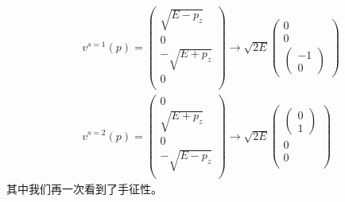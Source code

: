 \begin{equation}
\begin{aligned}
    &v^{s=1}(p)=\left(\begin{array}{cc}
         \sqrt{E-p_{z}}  \\
         0 \\
         -\sqrt{E+p_{z}}\\
         0\\
    \end{array}\right)\longrightarrow 
    \sqrt{2E}\left(\begin{array}{cc}
         0  \\
         0 \\
        \left(\begin{array}{cc}
             -1  \\
             0 
        \end{array}\right)
    \end{array}\right)\\
    &v^{s=2}(p)=\left(\begin{array}{cc}
    0\\
         \sqrt{E+p_{z}}  \\
         0 \\
         -\sqrt{E-p_{z}}\\
    \end{array}\right)\longrightarrow 
    \sqrt{2E}\left(\begin{array}{cc}
         \left(\begin{array}{cc}
             0  \\
             1 
        \end{array}\right)\\
         0\\
         0\\
    \end{array}\right)
    \end{aligned}
\end{equation}
其中我们再一次看到了手征性。

